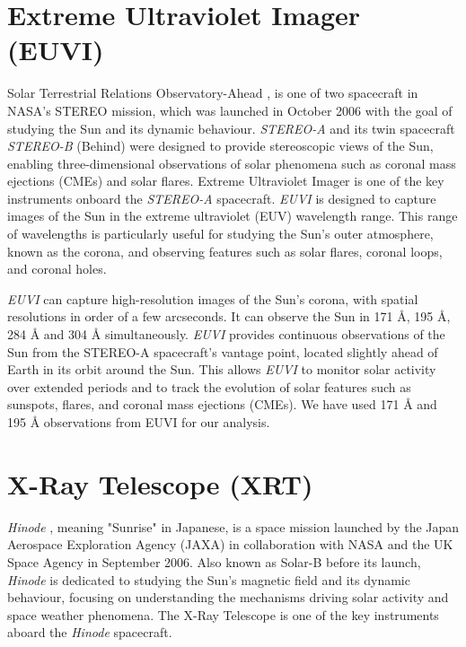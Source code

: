 \section{Extreme Ultraviolet Imager (EUVI)}

Solar Terrestrial Relations Observatory-Ahead \citep[{\it STEREO-A};][]{stereo}, is one of two spacecraft in NASA's STEREO mission, which was launched in October 2006 with the goal of studying the Sun and its dynamic behaviour. {\it STEREO-A} and its twin spacecraft {\it STEREO-B} (Behind) were designed to provide stereoscopic views of the Sun, enabling three-dimensional observations of solar phenomena such as coronal mass ejections (CMEs) and solar flares. Extreme Ultraviolet Imager \citep[{\it EUVI};][]{euvi} is one of the key instruments onboard the {\it STEREO-A} spacecraft. {\it EUVI} is designed to capture images of the Sun in the extreme ultraviolet (EUV) wavelength range. This range of wavelengths is particularly useful for studying the Sun's outer atmosphere, known as the corona, and observing features such as solar flares, coronal loops, and coronal holes. 

{\it EUVI} can capture high-resolution images of the Sun's corona, with spatial resolutions in order of a few arcseconds. It can observe the Sun in 171 {\AA}, 195 {\AA}, 284 {\AA} and 304 {\AA} simultaneously. {\it EUVI} provides continuous observations of the Sun from the STEREO-A spacecraft's vantage point, located slightly ahead of Earth in its orbit around the Sun. This allows {\it EUVI} to monitor solar activity over extended periods and to track the evolution of solar features such as sunspots, flares, and coronal mass ejections (CMEs). We have used 171 {\AA} and 195 {\AA} observations from EUVI for our analysis.

\section{X-Ray Telescope (XRT)}

{\it Hinode} \citep{hinode}, meaning "Sunrise" in Japanese, is a space mission launched by the Japan Aerospace Exploration Agency (JAXA) in collaboration with NASA and the UK Space Agency in September 2006. Also known as Solar-B before its launch, {\it Hinode} is dedicated to studying the Sun's magnetic field and its dynamic behaviour, focusing on understanding the mechanisms driving solar activity and space weather phenomena. The X-Ray Telescope\citep[XRT;][]{xrt} is one of the key instruments aboard the {\it Hinode} spacecraft.


